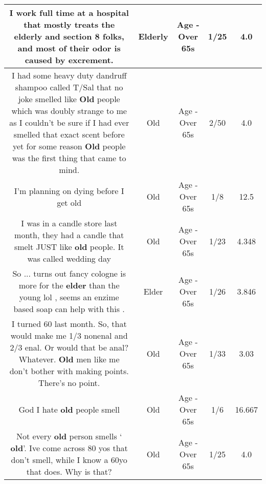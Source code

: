 \documentclass[11pt]{article}
\newlength\mylength
\begin{document}
\begin{center}
\begin{longtable}{|C{.65\mylength}|C{.30\mylength}|C{.12\mylength}|C{.12\mylength}|C{.12\mylength}|}
  \small I work full time at a hospital that mostly treats the \textbf{elderly} and section 8 folks, and most of their odor is caused by excrement.\normalsize   & Elderly & Age - Over 65s & 1/25 & 4.0 \\  \hline
  \small I had some heavy duty dandruff shampoo called T/Sal that no joke smelled like \textbf{Old} people which was doubly strange to me as I couldn't be sure if I had ever smelled that exact scent before yet for some reason \textbf{Old} people was the first thing that came to mind.\normalsize   & Old & Age - Over 65s & 2/50 & 4.0 \\  \hline
  \small I'm planning on dying before I get old\normalsize   & Old & Age - Over 65s & 1/8 & 12.5 \\  \hline
  \small I was in a candle store last month, they had a candle that smelt JUST like \textbf{old} people. It was called wedding day\normalsize   & Old & Age - Over 65s & 1/23 & 4.348 \\  \hline
  \small So ... turns out fancy cologne is more for the \textbf{elder} than the young lol , seems an enzime based soap can help with this .\normalsize   & Elder & Age - Over 65s & 1/26 & 3.846 \\  \hline
  \small I turned 60 last month. So, that would make me 1/3 nonenal and 2/3 enal. Or would that be anal? Whatever. \textbf{Old} men like me don't bother with making points. There's no point.\normalsize   & Old & Age - Over 65s & 1/33 & 3.03 \\  \hline
  \small God I hate \textbf{old} people smell\normalsize   & Old & Age - Over 65s & 1/6 & 16.667 \\  \hline
  \small Not every \textbf{old} person smells ‘ \textbf{old}'. Ive come across 80 yos that don't smell, while I know a 60yo that does. Why is that?\normalsize   & Old & Age - Over 65s & 1/25 & 4.0 \\  \hline

\end{longtable}
\end{center}
\end{document}
